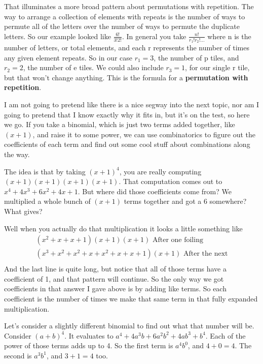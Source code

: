\documentclass{article}
\begin{document}
    That illuminates a more broad pattern about permutations with repetition.
    The way to arrange a collection of elements with repeats is the number of ways to permute all of the letters over the number of ways to permute the duplicate letters.
    So our example looked like $\frac{6!}{3!2!}$.
    In general you take $\frac{n!}{r_1! r_2!\dots}$
    where n is the number of letters, or total elements, and each r represents the number of times any given element repeats.
    So in our case $r_1 = 3$, the number of p tiles, and $r_2 = 2$, the number of e tiles.
    We could also include $r_3 = 1$, for our single r tile, but that won't change anything. 
    This is the formula for a \textbf{permutation with repetition}.

    I am not going to pretend like there is a nice segway into the next topic, nor am I going to pretend that I know exactly why it fits in, but it's on the test, so here we go.
    If you take a binomial, which is just two terms added together, like $(x+1)$, and raise it to some power, we can use combinatorics to figure out the coefficients of each term and find out some cool stuff about combinations along the way.

    The idea is that by taking $(x+1)^4$, you are really computing $(x+1)(x+1)(x+1)(x+1)$.
    That computation comes out to $x^4 + 4x^3 + 6x^2 + 4x + 1$.
    But where did those coefficients come from?
    We multiplied a whole bunch of $(x+1)$ terms together and got a 6 somewhere?
    What gives?

    Well when you actually do that multiplication it looks a little something like
    \begin{gather*}
        (x^2 + x + x + 1)(x+1)(x+1)\text{ After one foiling} \\
        (x^3 + x^2 + x^2 + x + x^2 + x + x + 1)(x+1)\text{ After the next} \\
    \end{gather*}
    And the last line is quite long, but notice that all of those terms have a coefficient of 1, and that pattern will continue.
    So the only way we got coefficients in that answer I gave above is by adding like terms.
    So each coefficient is the number of times we make that same term in that fully expanded multiplication.

    Let's consider a slightly different binomial to find out what that number will be.
    Consider $(a+b)^4$.
    It evaluates to $a^4 + 4a^3b + 6a^2b^2 + 4ab^3 + b^4$.
    Each of the power of those terms adds up to 4.
    So the first term is $a^4b^0$, and $4+0 = 4$. 
    The second is $a^3b^1$, and $3 + 1 = 4$ too.
\end{document}
